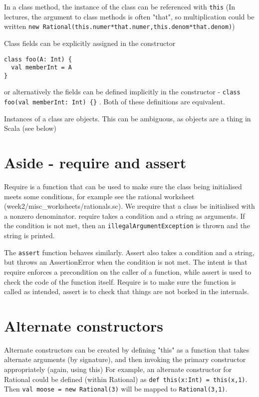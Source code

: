 In a class method, the instance of the class can be referenced with \lstinline|this| (In lectures, the argument to class methods is often "that", so multiplication could be written \lstinline|new Rational(this.numer*that.numer,this.denom*that.denom)|)

Class fields can be explicitly assigned in the constructor
\begin{lstlisting}
class foo(A: Int) {
  val memberInt = A
}
\end{lstlisting}
or alternatively the fields can be defined implicitly in the constructor - \lstinline|class foo(val memberInt: Int) {}| . Both of these definitions are equivalent.

Instances of a class are objects. This can be ambiguous, as objects are a thing in Scala (see below)

\section{ Aside - require and assert}
Require is a function that can be used to make sure the class being initialised meets some conditions, for example see the rational worksheet (week2/misc\_worksheets/rationals.sc). We {\i require} that a class be initialised with a nonzero denominator. require takes a condition and a string as arguments. If the condition is not met, then an \lstinline|illegalArgumentException| is thrown and the string is printed.

The \lstinline|assert| function behaves similarly. Assert also takes a condition and a string, but throws an AssertionError when the condition is not met. The intent is that require enforces a precondition on the caller of a function, while assert is used to check the code of the function itself. Require is to make sure the function is called as intended, assert is to check that things are not borked in the internals.

\section{Alternate constructors}
Alternate constructors can be created by defining "this" as a function that takes alternate arguments (by signature), and then invoking the primary constructor appropriately (again, using this)
For example, an alternate constructor for Rational could be defined (within Rational) as \lstinline|def this(x:Int) = this(x,1)|. Then \lstinline|val moose = new Rational(3)| will be mapped to \lstinline|Rational(3,1)|.

